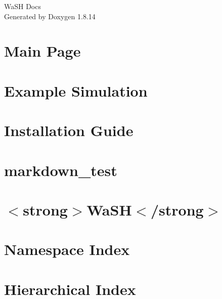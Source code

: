 \documentclass[twoside]{book}
\newcommand{\+}{\discretionary{\mbox{\scriptsize$\hookleftarrow$}}{}{}}
\newcommand{\clearemptydoublepage}{%
  \newpage{\pagestyle{empty}\cleardoublepage}%
}
\begin{document}
\hypersetup{pageanchor=false,
             bookmarksnumbered=true,
             pdfencoding=unicode
            }
\begin{titlepage}
\vspace*{7cm}
\begin{center}%
{\Large Wa\+SH Docs }\\
\vspace*{1cm}
{\large Generated by Doxygen 1.8.14}\\
\end{center}
\end{titlepage}
\clearemptydoublepage
{}
\tableofcontents
\clearemptydoublepage
{}
\hypersetup{pageanchor=true}

\chapter{Main Page}
\label{index}\hypertarget{index}{}
\chapter{Example Simulation}
\label{md_markdown_example_usecase}

\chapter{Installation Guide}
\label{md_markdown_installation}

\chapter{markdown\+\_\+test}
\label{md_markdown_markdown_test}

\chapter{$<$strong$>$Wa\+SH$<$/strong$>$}
\label{md__dcs_20_u2002000_4thYearProject_wash_README}

\chapter{Namespace Index}

\chapter{Hierarchical Index}

\end{document}
